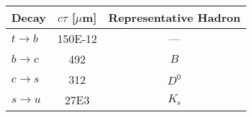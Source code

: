 \begin{tabular}{l S[table-format=3.0e1] c} %
  Decay & $c\tau$ [$\mu$m] & Representative Hadron \\ \hline
  $t \to b$ & 150E-12 & --- \\
  $b \to c$ & 492  & $B$ \\
  $c \to s$ & 312  & $D^0$ \\
  $s \to u$ & 27E3  & $K_{\mathrm{s}}$
\end{tabular}
